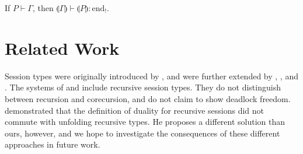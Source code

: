 \documentclass[orivec,envcountsame]{llncs}
\newcommand{\cpdual}[1]{#1^\perp}
\newcommand{\gvdual}[1]{\overline{#1}}
\newcommand{\gvout}[2]{{!#1.#2}}
\newcommand{\outterm}{\mathrm{end}_!}
\newcommand{\gvservice}[1]{\sharp #1}
\newcommand{\cptyp}[2]{#1 \vdash #2}
\newcommand{\gvtyp}[3]{#1 \vdash #2 : #3}
\newcommand{\mapname}{\mathsf{map}}
\newcommand{\gvmap}[3]{\mapname^{#1}_{#2}\:#3}
\newcommand{\mkwd}[1]{\mathsf{#1}}
\newcommand{\gvsend}[2]{\mkwd{send}\:#1\:#2}
\newcommand{\gvlet}[3]{\mkwd{let}\;#1 = #2\;\mkwd{in}\;#3}
\newcommand{\gvfork}[2]{\mkwd{fork}\:#1.#2}
\newcommand{\lrkwd}{\mkwd{cofix}}
\newcommand{\gvfix}[3]{\lrkwd\:#1\:#2 = #3}
\newcommand{\togv}[1]{\llparenthesis #1 \rrparenthesis}
\newcommand{\mucp}{$\mu\mathrm{CP}$\xspace}
\newcommand{\mugv}{$\mu\mathrm{GV}$\xspace}
\begin{document}
%







\begin{theorem}
  If $\cptyp{P}{\Gamma}$, then $\gvtyp{\togv{\Gamma}}{\togv{P}}{\outterm}$.
\end{theorem}

\section{Related Work}\label{sec:related}

Session types were originally introduced by \citet{Honda93}, and were further extended by
\citet{Takeuchi94}, \citet{Honda98}, and \citet{Yoshida07}.  The systems of \citet{Honda98} and
\citet{Yoshida07} include recursive session types.  They do not distinguish between recursion and
corecursion, and do not claim to show deadlock freedom.  \citet{Bernardi13} demonstrated that the
definition of duality for recursive sessions did not commute with unfolding recursive types.  He
proposes a different solution than ours, however, and we hope to investigate the consequences of
these different approaches in future work.
\end{document}
